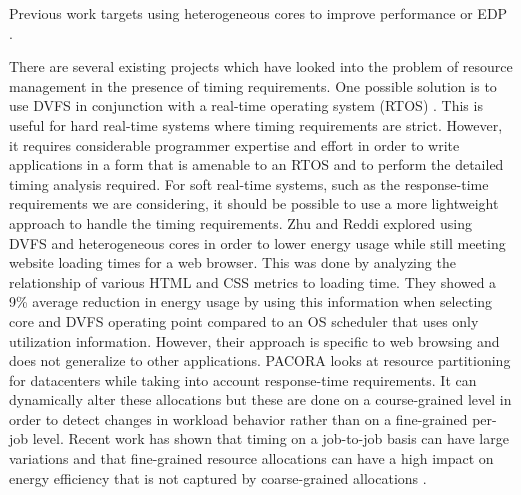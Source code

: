 Previous work targets using heterogeneous cores to improve performance
\cite{paragon-asplos13, pie-isca12, heteroscouts-sigmetrics11} or EDP \cite{chen-dac09}.

There are several existing projects which have looked into the problem of
resource management in the presence of timing requirements. One possible
solution is to use DVFS in conjunction with a real-time operating system (RTOS)
\cite{rtdvfs-systor12}. This is useful for hard real-time systems where timing
requirements are strict. However, it requires considerable programmer expertise
and effort in order to write applications in a form that is amenable to an RTOS
and to perform the detailed timing analysis required. For soft real-time
systems, such as the response-time requirements we are considering, it should
be possible to use a more lightweight approach to handle the timing
requirements. Zhu and Reddi \cite{zhu-hpca13} explored using DVFS and
heterogeneous cores in order to lower energy usage while still meeting website
loading times for a web browser. This was done by analyzing the relationship of
various HTML and CSS metrics to loading time. They showed a 9\% average
reduction in energy usage by using this information when selecting core and
DVFS operating point compared to an OS scheduler that uses only utilization
information.  However, their approach is specific to web browsing and does not
generalize to other applications. PACORA \cite{pacora-hotpar11} looks at
resource partitioning for datacenters while taking into account response-time
requirements. It can dynamically alter these allocations but these are done on
a course-grained level in order to detect changes in workload behavior rather
than on a fine-grained per-job level. Recent work has shown that timing on a
job-to-job basis can have large variations \cite{atlas-rtas13} and that
fine-grained resource allocations can have a high impact on energy efficiency
that is not captured by coarse-grained allocations \cite{padmanabha-micro13}.

